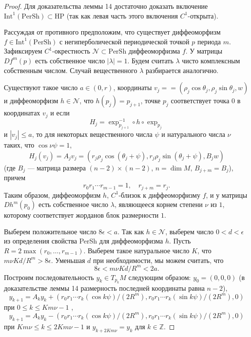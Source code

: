 \documentclass[12pt]{article}
\begin{document}
\begin{proof}
Для доказательства леммы 14 достаточно доказать включение $\mbox{Int}^1(\mbox{PerSh})\subset\mbox{HP}$ (так как левая часть этого включения $C^1$-открыта). 

Рассуждая от противного предположим, что существует диффеоморфизм $f\in\mbox{Int}^1(\mbox{PerSh})$ с негиперболической периодической точкой $p$ периода $m$. Зафиксируем $C^1$-окрестность $\mathcal{N}\subset\mbox{PerSh}$ диффеоморфизма $f$. У матрицы $Df^m(p)$ есть собственное число $|\lambda|=1$. Будем считать $\lambda$ чисто комплексным собственным числом. Случай вещественного $\lambda$ разбирается аналогично. 

Существуют такое число $a\in (0,r)$, координаты $v_j=\allowbreak=(\rho_j\cos\theta_j,\rho_j\sin\theta_j,w)$ и диффеоморфизм $h\in\mathcal{N}$, что $h(p_j)=p_{j+1}$, точке $p_j$ соответствует точка $0$ в координатах $v_j$
и если
$$H_j=\exp^{-1}_{p_{j+1}}\circ h\circ\exp_{p_j}$$
и $|v_j|\leq a$, то для некоторых вещественного числа $\psi$ и натурального числа $\nu$ таких, что $\cos\nu\psi=1$,%
$$H_j(v_j)=A_jv_j=(r_j\rho_j\cos(\theta_j+\psi),r_j\rho_j\sin(\theta_j+\psi),B_jw)$$
(где $B_j$ --- матрица размера $(n-2)\times(n-2)$, $n=\dim M$, $B_{j+m}=B_j$),
причем
\begin{equation}
\label{3.2.2}
r_0r_1\cdots r_{m-1}=1,\quad r_{j+m}=r_j.
\end{equation}
Таким образом, диффеоморфизм $h$, $C^1$-близок к диффеоморфизму $f$, и у матрицы $Dh^m(p_0)$ есть собственное число $\lambda$, являющееся корнем степени $\nu$ из $1$, которому соответствует жорданов блок размерности $1$.

Выберем положительное число $8\epsilon<a$. Так как $h\in\mathcal{N}$, выберем число $0<d<\epsilon$ из определения свойства PerSh для диффеоморфизма $h$. Пусть $R=2\max(r_0,\ldots,r_{m-1})$. Выберем такое натуральное число $K$, что $m\nu Kd/R^m>8\epsilon$. Уменьшая $d$ при необходимости, мы можем считать, что
\begin{equation}
\label{3.2.3}
8\epsilon<m\nu Kd/R^m<2a.
\end{equation}
Построим последовательность $y_k\in T_{p_k}M$ следующим образом:
$y_0=(0,0,0)$ (в доказательстве леммы 14 размерность последней координаты равна $n-2$), $$y_{k+1}=A_ky_k+(r_0r_1\cdots r_k(\cos k\psi)/(2R^m),r_0r_1\cdots r_k(\sin k\psi)/(2R^m),0)$$
при $0\leq k\leq Km\nu - 1$ ,
$$y_{k+1}=A_ky_k-(r_0r_1\cdots r_k(\cos k\psi)/(2R^m),r_0r_1\cdots r_k(\sin k\psi)/(2R^m),0)$$
при $Km\nu\leq k\leq 2Km\nu-1$
и $y_{k+2Km\nu}=y_k$ для $k\in\mathbb{Z}$.


\end{proof}
\end{document}
